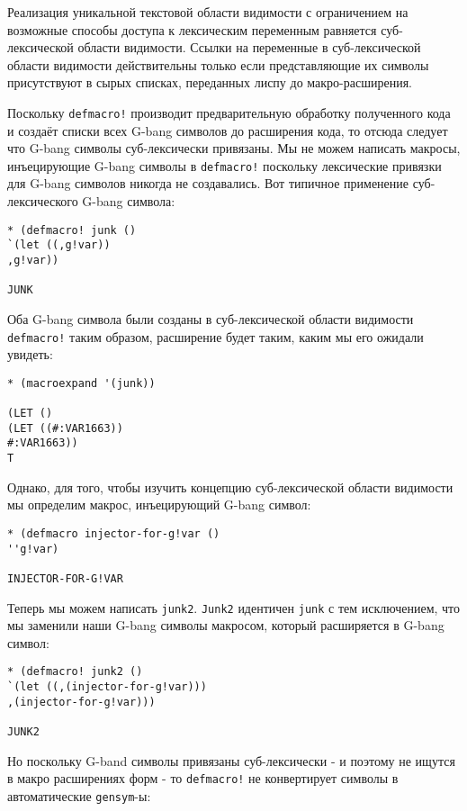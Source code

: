 Реализация уникальной текстовой области видимости с ограничением на возможные способы доступа к лексическим переменным равняется суб-лексической области видимости. Ссылки на переменные в суб-лексической области видимости действительны только если представляющие их символы присутствуют в сырых списках, переданных лиспу до макро-расширения.

Поскольку \verb"defmacro!" производит предварительную обработку полученного кода и создаёт списки всех G-bang символов до расширения кода, то отсюда следует что G-bang символы суб-лексически привязаны. Мы не можем написать макросы, инъецирующие G-bang символы в \verb"defmacro!" поскольку лексические привязки для G-bang символов никогда не создавались. Вот типичное применение суб-лексического G-bang символа:

\begin{verbatim}
* (defmacro! junk ()
`(let ((,g!var))
,g!var))

JUNK
\end{verbatim}

Оба G-bang символа были созданы в суб-лексической области видимости \verb"defmacro!" таким образом, расширение будет таким, каким мы его ожидали увидеть:

\begin{verbatim}
* (macroexpand '(junk))

(LET ()
(LET ((#:VAR1663))
#:VAR1663))
T
\end{verbatim}

Однако, для того, чтобы изучить концепцию суб-лексической области видимости мы определим макрос, инъецирующий G-bang символ:

\begin{verbatim}
* (defmacro injector-for-g!var ()
''g!var)

INJECTOR-FOR-G!VAR
\end{verbatim}

Теперь мы можем написать \verb"junk2". \verb"Junk2" идентичен \verb"junk" с тем исключением, что мы заменили наши G-bang символы макросом, который расширяется в G-bang символ:

\begin{verbatim}
* (defmacro! junk2 ()
`(let ((,(injector-for-g!var)))
,(injector-for-g!var)))

JUNK2
\end{verbatim}

Но поскольку G-band символы привязаны суб-лексически - и поэтому не ищутся в макро расширениях форм - то \verb"defmacro!" не конвертирует символы в автоматические \verb"gensym"-ы:

